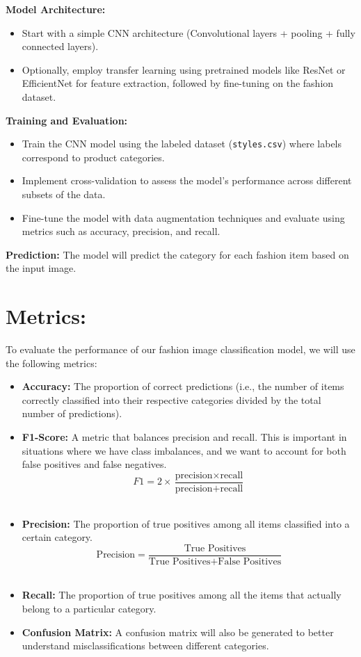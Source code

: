 \documentclass[12pt]{article}
\begin{document}
\textbf{Model Architecture:}
\begin{itemize}
    \item Start with a simple CNN architecture (Convolutional layers + pooling + fully connected layers).
    \item Optionally, employ transfer learning using pretrained models like ResNet or EfficientNet for feature extraction, followed by fine-tuning on the fashion dataset.
\end{itemize}

\textbf{Training and Evaluation:}
\begin{itemize}
    \item Train the CNN model using the labeled dataset (\texttt{styles.csv}) where labels correspond to product categories.
    \item Implement cross-validation to assess the model's performance across different subsets of the data.
    \item Fine-tune the model with data augmentation techniques and evaluate using metrics such as accuracy, precision, and recall.
\end{itemize}

\textbf{Prediction:}
The model will predict the category for each fashion item based on the input image.

\section*{Metrics:}
To evaluate the performance of our fashion image classification model, we will use the following metrics:
\begin{itemize}
    \item \textbf{Accuracy:} The proportion of correct predictions (i.e., the number of items correctly classified into their respective categories divided by the total number of predictions).
    \item \textbf{F1-Score:} A metric that balances precision and recall. This is important in situations where we have class imbalances, and we want to account for both false positives and false negatives.
    \begin{equation}
        F1 = 2 \times \frac{\text{precision} \times \text{recall}}{\text{precision} + \text{recall}}
    \end{equation}
    \item \textbf{Precision:} The proportion of true positives among all items classified into a certain category.
    \begin{equation}
        \text{Precision} = \frac{\text{True Positives}}{\text{True Positives} + \text{False Positives}}
    \end{equation}
    \item \textbf{Recall:} The proportion of true positives among all the items that actually belong to a particular category.
    \item \textbf{Confusion Matrix:} A confusion matrix will also be generated to better understand misclassifications between different categories.
\end{itemize}
\end{document}
